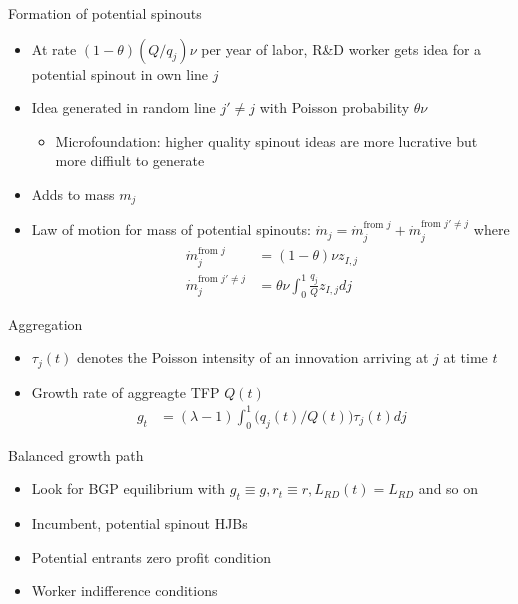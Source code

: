\documentclass[english,usenames,dvipsnames]{beamer}
\begin{document}
\begin{frame}{Formation of potential spinouts}
\begin{itemize}
\item At rate $(1-\theta)(Q/q_j) \nu$ per year of labor, R\&D worker gets idea for a potential spinout in own line $j$
\item Idea generated in random line $j' \ne j$ with Poisson probability $\theta \nu$ 
\begin{itemize}
	\item Microfoundation: higher quality spinout ideas are more lucrative but more diffiult to generate
\end{itemize}
\item Adds to mass $m_j$
\item Law of motion for mass of potential spinouts: $\dot{m}_j = \dot{m}_j^{\textrm{from $j$}} + \dot{m}_j^{\textrm{from $j' \ne j$}}$ where
\begin{align*}
\dot{m}_j^{\textrm{from $j$}}&= (1-\theta) \nu z_{I,j}\\
\dot{m}_j^{\textrm{from $j' \ne j$}} &= \theta \nu \int_0^1 \frac{q_j}{Q} z_{I,j} dj
\end{align*}
\end{itemize}
\end{frame}


\begin{frame}{Aggregation}
\begin{itemize}
\item $\tau_j(t)$ denotes the Poisson intensity of an innovation arriving at $j$ at time $t$
\item Growth rate of aggreagte TFP $Q(t)$
\begin{align*}
g_t &= (\lambda -1) \int_0^1 \Big(q_{j}(t)/Q(t)\Big) \tau_j(t) dj 
\end{align*}
\end{itemize}
\end{frame}


\begin{frame}{Balanced growth path}
\begin{itemize}
\item Look for BGP equilibrium with $g_t \equiv g, r_t \equiv r, L_{RD}(t) = L_{RD}$ and so on  
\item Incumbent, potential spinout HJBs
\item Potential entrants zero profit condition
\item Worker indifference conditions
\end{itemize}
\end{frame}
\end{document}
